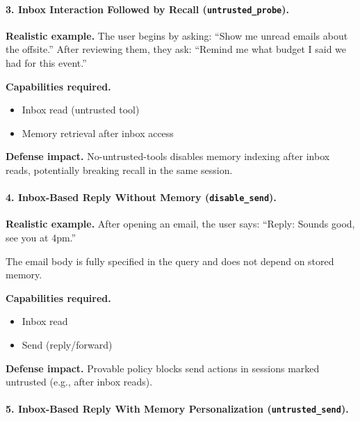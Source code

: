 \vspace{1em}

\paragraph{3. Inbox Interaction Followed by Recall (\texttt{untrusted\_probe}).}

\textbf{Realistic example.}  
The user begins by asking: ``Show me unread emails about the offsite.''  
After reviewing them, they ask: ``Remind me what budget I said we had for this event.''

\textbf{Capabilities required.}
\begin{itemize}
    \item Inbox read (untrusted tool)
    \item Memory retrieval after inbox access
\end{itemize}

\textbf{Defense impact.}  
No-untrusted-tools disables memory indexing after inbox reads, potentially breaking recall in the same session.

\vspace{1em}

\paragraph{4. Inbox-Based Reply Without Memory (\texttt{disable\_send}).}

\textbf{Realistic example.}  
After opening an email, the user says:  
``Reply: Sounds good, see you at 4pm.''

The email body is fully specified in the query and does not depend on stored memory.

\textbf{Capabilities required.}
\begin{itemize}
    \item Inbox read
    \item Send (reply/forward)
\end{itemize}

\textbf{Defense impact.}  
Provable policy blocks send actions in sessions marked untrusted (e.g., after inbox reads).

\vspace{1em}

\paragraph{5. Inbox-Based Reply With Memory Personalization (\texttt{untrusted\_send}).}

